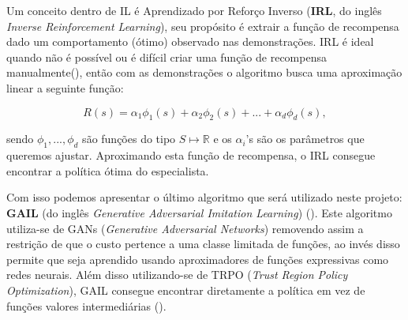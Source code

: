 Um conceito dentro de IL é Aprendizado por Reforço Inverso (\textbf{IRL}, do inglês \textit{Inverse Reinforcement Learning}), seu propósito é extrair a função de recompensa dado um comportamento (ótimo) observado nas demonstrações. IRL é ideal quando não é possível ou é difícil criar uma função de recompensa manualmente(), então com as demonstrações o algoritmo busca uma aproximação linear a seguinte função:

\begin{equation}
   R(s) = \alpha_1 \phi_1(s) + \alpha_2 \phi_2(s) + ... + \alpha_d \phi_d(s),
\end{equation}

sendo $\phi_1, ..., \phi_d$ são funções do tipo $S \mapsto \mathbb{R}$ e os $\alpha_i$'s são os parâmetros que queremos ajustar. Aproximando esta função de recompensa, o IRL consegue encontrar a política ótima do especialista.

Com isso podemos apresentar o último algoritmo que será utilizado neste projeto: \textbf{GAIL} (do inglês \textit{Generative Adversarial Imitation Learning}) (). Este algoritmo utiliza-se de GANs (\textit{Generative Adversarial Networks}) removendo assim a restrição de que o custo pertence a uma classe limitada de funções, ao invés disso permite que seja aprendido usando aproximadores de funções expressivas como redes neurais. Além disso utilizando-se de TRPO (\textit{Trust Region Policy Optimization}), GAIL consegue encontrar diretamente a política em vez de funções valores intermediárias ().